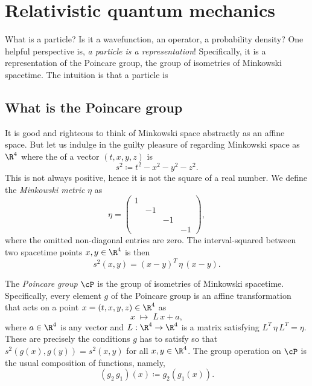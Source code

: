 \section{Relativistic quantum mechanics}
What is a particle? Is it a wavefunction, an operator, a probability density? One helpful perspective is, \emph{a particle is a representation}! Specifically, it is a representation of the Poincare group, the group of isometries of Minkowski spacetime. The intuition is that a particle is 

\subsection{What is the Poincare group}
It is good and righteous to think of Minkowski space abstractly as an affine space. But let us indulge in the guilty pleasure of regarding Minkowski space as $\R^4$ where the  of a vector $(t, x, y, z)$ is
\begin{equation*}
    s^2 \coloneqq t^2 - x^2 - y^2 - z^2.
\end{equation*}
This  is not always positive, hence it is not the square of a real number. We define the \emph{Minkowski metric} $\eta$ as
\begin{equation*}
    \eta = \begin{pmatrix}
        1 & & & \\
        & -1 & &\\
        & & -1 & \\
        & & & -1
    \end{pmatrix},
\end{equation*}
where the omitted non-diagonal entries are zero. The interval-squared between two spacetime points $x, y \in \R^4$ is then
\begin{equation*}
    s^2(x, y) = (x - y)^T \, \eta \, (x - y).
\end{equation*}
\begin{definition}
The \emph{Poincare group} $\cP$ is the group of isometries of Minkowski spacetime. Specifically, every element $g$ of the Poincare group is an affine transformation that acts on a point $x = (t, x, y, z) \in \R^4$ as
\begin{equation}
    x \; \longmapsto \; L \, x + a,
\end{equation}
where $a \in \R^4$ is any vector and $L: \R^4 \to \R^4$ is a matrix satisfying $L^T \, \eta \, L^T = \eta$. These are precisely the conditions $g$ has to satisfy so that $s^2(g(x), g(y)) = s^2(x, y)$ for all $x, y \in \R^4$. The group operation on $\cP$ is the usual composition of functions, namely,
\begin{equation*}
    (g_2 \, g_1)(x) \coloneqq g_2(g_1(x)).
\end{equation*}
\end{definition}
